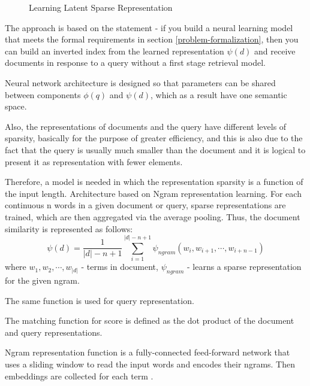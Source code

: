 \documentclass[
    twocolumn,
]{ceurart}
\begin{document}
    \begin{figure}[h]
        \centering
        \def\svgwidth{\columnwidth}
        
        \caption{Learning Latent Sparse Representation}
    \end{figure}

    The approach is based on the statement - if you build a neural learning model that meets the
    formal requirements in section \ref{problem-formalization}, then you can build an inverted
    index from the learned representation $\psi(d)$ and receive documents in response to a query
    without a first stage retrieval model.

    Neural network architecture is designed so that parameters can be shared between components
    $\phi(q)$ and $\psi(d)$, which as a result have one semantic space.

    Also, the representations of documents and the query have different levels of sparsity,
    basically for the purpose of greater efficiency, and this is also due to the fact that
    the query is usually much smaller than the document and it is logical to present it as
    representation with fewer elements.

    Therefore, a model is needed in which the representation sparsity is a function
    of the input length.
    Architecture based on Ngram representation learning.
    For each continuous n words in a given document or query, sparse representations are trained,
    which are then aggregated via the average pooling.
    Thus, the document similarity is represented as follows:
    \begin{equation}
        \psi(d)=
        \frac{1}{|d| - n + 1}
        \sum_{i=1}^{|d| - n + 1}
        \psi_{ngram}(w_i, w_{i+1}, \cdots, w_{i+n-1})
    \end{equation}
    where $w_1, w_2, \cdots, w_{|d|}$ - terms in document, $\psi_{ngram}$ - learns a sparse representation
    for the given ngram.

    The same function is used for query representation.

    The matching function for score is defined as the dot product of the document and query
    representations.

    Ngram representation function is a fully-connected feed-forward network that uses a sliding
    window to read the input words and encodes their ngrams.
    Then embeddings are collected for each term \cite{SNRM}.
\end{document}

